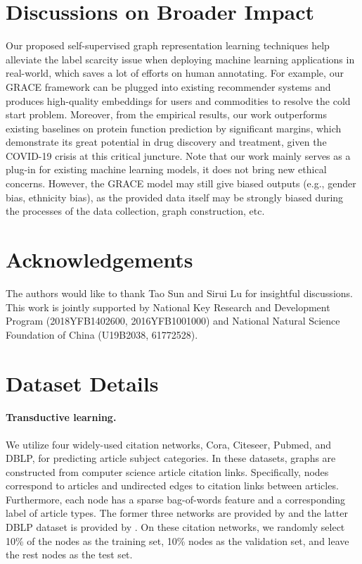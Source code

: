 \documentclass{article}
\theoremstyle{remark}
\begin{document}
 \section*{Discussions on Broader Impact}

Our proposed self-supervised graph representation learning techniques help alleviate the label scarcity issue when deploying machine learning applications in real-world, which saves a lot of efforts on human annotating.
For example, our GRACE framework can be plugged into existing recommender systems and produces high-quality embeddings for users and commodities to resolve the cold start problem.
Moreover, from the empirical results, our work outperforms existing baselines on protein function prediction by significant margins, which demonstrate its great potential in drug discovery and treatment, given the COVID-19 crisis at this critical juncture.
Note that our work mainly serves as a plug-in for existing machine learning models, it does not bring new ethical concerns.
However, the GRACE model may still give biased outputs (e.g., gender bias, ethnicity bias), as the provided data itself may be strongly biased during the processes of the data collection, graph construction, etc.

\section*{Acknowledgements}

The authors would like to thank Tao Sun and Sirui Lu for insightful discussions.
This work is jointly supported by National Key Research and Development Program (2018YFB1402600, 2016YFB1001000) and National Natural Science Foundation of China (U19B2038, 61772528).
 
\clearpage
\appendix
\section{Dataset Details}
\label{appendix:dataset}

\paragraph{Transductive learning.}
We utilize four widely-used citation networks, Cora, Citeseer, Pubmed, and DBLP, for predicting article subject categories.
In these datasets, graphs are constructed from computer science article citation links. Specifically, nodes correspond to articles and undirected edges to citation links between articles. Furthermore, each node has a sparse bag-of-words feature and a corresponding label of article types.
The former three networks are provided by \cite{Sen:2008gm,Yang:2016ts} and the latter DBLP dataset is provided by \cite{Bojchevski:2018ua}.
On these citation networks, we randomly select 10\% of the nodes as the training set, 10\% nodes as the validation set, and leave the rest nodes as the test set.
\end{document}
